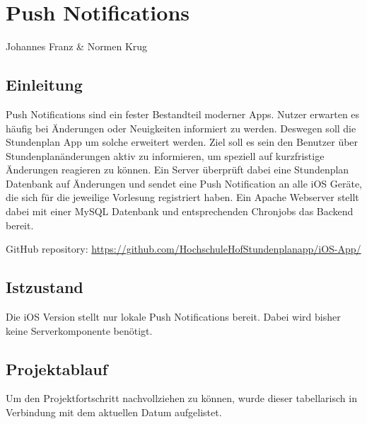 \chapter{Push Notifications}
Johannes Franz \& Normen Krug

\section{Einleitung}
Push Notifications sind ein fester Bestandteil moderner Apps. Nutzer erwarten es häufig bei Änderungen oder Neuigkeiten informiert zu werden. Deswegen soll die Stundenplan App um solche erweitert werden. Ziel soll es sein den Benutzer über Stundenplanänderungen aktiv zu informieren, um speziell auf kurzfristige Änderungen reagieren zu können. Ein Server überprüft dabei eine Stundenplan Datenbank auf Änderungen und sendet eine Push Notification an alle iOS Geräte, die sich für die jeweilige Vorlesung registriert haben. Ein Apache Webserver stellt dabei mit einer MySQL Datenbank und entsprechenden Chronjobs das Backend bereit.

GitHub repository: \url{https://github.com/HochschuleHofStundenplanapp/iOS-App/}


\section{Istzustand}
Die iOS Version stellt nur lokale Push Notifications bereit. Dabei wird bisher keine Serverkomponente benötigt.

\section{Projektablauf}
Um den Projektfortschritt nachvollziehen zu können, wurde dieser tabellarisch in Verbindung mit dem aktuellen Datum aufgelistet.


